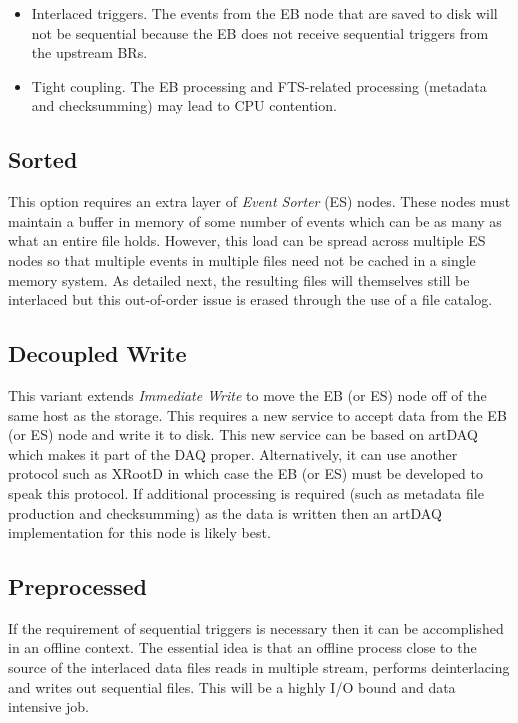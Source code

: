 \documentclass[pdftex,12pt,letter]{article}
\begin{document}
\begin{itemize}

\item Interlaced triggers.  The events from the EB node that are saved
  to disk will not be sequential because the EB does not receive
  sequential triggers from the upstream BRs.

\item Tight coupling.  The EB processing and FTS-related processing
  (metadata and checksumming) may lead to CPU contention.
\end{itemize}

\subsection{Sorted}

This option requires an extra layer of \textit{Event Sorter} (ES) nodes.  These nodes must maintain
a buffer in memory of some number of events which can be as many as
what an entire file holds.  However, this load can be spread across
multiple ES nodes so that multiple events in multiple files need not
be cached in a single memory system.  As detailed next, the resulting
files will themselves still be interlaced but this out-of-order issue
is erased through the use of a file catalog.

\subsection{Decoupled Write}

This variant extends \textit{Immediate Write} to move the EB (or ES)
node off of the same host as the storage.  This requires a new service
to accept data from the EB (or ES) node and write it to disk.  This
new service can be based on artDAQ which makes it part of the DAQ
proper.  Alternatively, it can use another protocol such as XRootD in
which case the EB (or ES) must be developed to speak this protocol.
If additional processing is required (such as metadata file production
and checksumming) as the data is written then an artDAQ implementation
for this node is likely best.

\subsection{Preprocessed}

If the requirement of sequential triggers is necessary then it can be
accomplished in an offline context.  The essential idea is that an
offline process close to the source of the interlaced data files reads
in multiple stream, performs deinterlacing and writes out sequential
files.  This will be a highly I/O bound and data intensive job.
\end{document}
